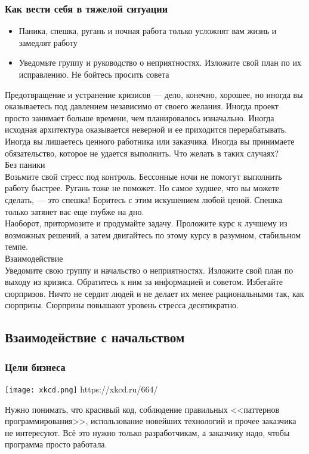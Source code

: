 \documentclass{../industrial-development}
\begin{document}
\begin{frame} \frametitle{Как вести себя в тяжелой ситуации}
\begin{itemize}
  \item Паника, спешка, ругань и ночная работа только усложнят вам жизнь и замедлят работу
  \item Уведомьте группу и руководство о неприятностях. Изложите свой план по их исправлению. Не бойтесь просить совета
\end{itemize}
\end{frame}
\lecturenotes
Предотвращение и устранение кризисов — дело, конечно, хорошее, но иногда вы оказываетесь под давлением независимо от своего желания. Иногда проект просто занимает больше времени, чем планировалось изначально. Иногда исходная архитектура оказывается неверной и ее приходится перерабатывать. Иногда вы лишаетесь ценного работника или заказчика. Иногда вы принимаете обязательство, которое не удается выполнить. Что желать в таких случаях?\\
Без паники\\
Возьмите свой стресс под контроль. Бессонные ночи не помогут выполнить работу быстрее. Ругань тоже не поможет. Но самое худшее, что вы можете сделать, — это спешка! Боритесь с этим искушением любой ценой. Спешка только затянет вас еще глубже на дно.\\
Наоборот, притормозите и продумайте задачу. Проложите курс к лучшему из возможных решений, а затем двигайтесь по этому курсу в разумном, стабильном темпе.\\
Взаимодействие\\
Уведомите свою группу и начальство о неприятностях. Изложите свой план по выходу из кризиса. Обратитесь к ним за информацией и советом. Избегайте сюрпризов. Ничто не сердит людей и не делает их менее рациональными так, как сюрпризы. Сюрпризы повышают уровень стресса десятикратно.

\subsection{Взаимодействие с начальством}

\begin{frame} \frametitle{Цели бизнеса}
{\texttt{[image: xkcd.png]}}
\scriptsize https://xkcd.ru/664/
\end{frame}
\lecturenotes
Нужно понимать, что красивый код, соблюдение правильных <<паттернов программирования>>, использование новейших технологий и прочее заказчика не интересуют. Всё это нужно только разработчикам, а заказчику надо, чтобы программа просто работала.
\end{document}

